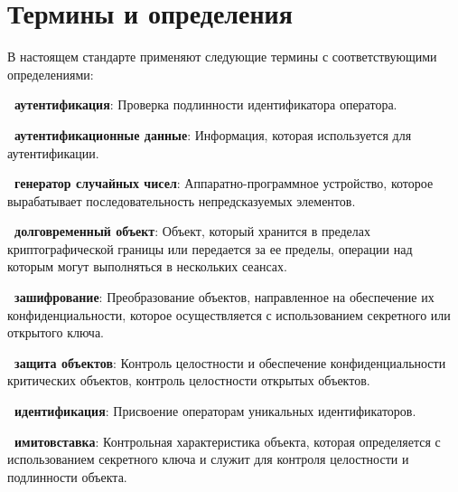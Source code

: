 \chapter{Термины и определения}\label{Terms}

В настоящем стандарте применяют  
%
%
следующие термины с соответствующими определениями:

{\bf \thedefctr~аутентификация}:
Проверка подлинности идентификатора оператора.


{\bf \thedefctr~аутентификационные данные}:
Информация, которая используется для аутентификации.


{\bf \thedefctr~генератор случайных чисел}:
Аппаратно-программное устройство, 
которое вырабатывает последовательность непредсказуемых 
элементов.


{\bf \thedefctr~долговременный объект}:
Объект, который хранится в пределах криптографической границы или передается
за ее пределы, операции над которым могут выполняться в нескольких сеансах.

{\bf \thedefctr~зашифрование}:
Преобразование объектов,
направленное на обеспечение их конфиденциальности,
которое осуществляется с использованием секретного или открытого ключа.


{\bf \thedefctr~защита объектов}:
Контроль целостности и обеспечение конфиденциальности критических объектов,
контроль целостности открытых объектов.

{\bf \thedefctr~идентификация}:
Присвоение операторам уникальных идентификаторов.

{\bf \thedefctr~имитовставка}:
Контрольная характеристика объекта, 
которая определяется с использованием секретного ключа 
и служит для контроля целостности и подлинности объекта.



